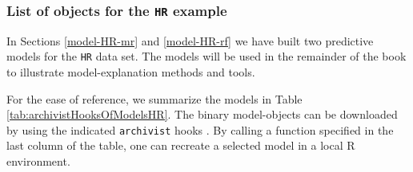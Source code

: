\documentclass[12pt,]{krantz}
\begin{document}
\hypertarget{ListOfModelsHR}{%
\subsubsection{\texorpdfstring{List of objects for the \texttt{HR} example}{List of objects for the HR example}}\label{ListOfModelsHR}}

In Sections \ref{model-HR-mr} and \ref{model-HR-rf} we have built two predictive models for the \texttt{HR} data set. The models will be used in the remainder of the book to illustrate model-explanation methods and tools.

For the ease of reference, we summarize the models in Table \ref{tab:archivistHooksOfModelsHR}. The binary model-objects can be downloaded by using the indicated \texttt{archivist} hooks \citep{archivist}. By calling a function specified in the last column of the table, one can recreate a selected model in a local R environment.
\end{document}
